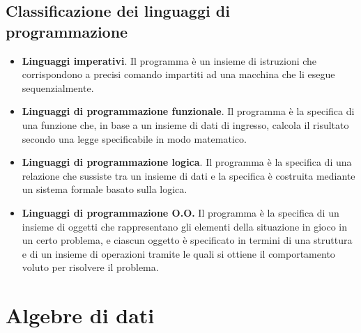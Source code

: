 \documentclass[12pt]{report}
\begin{document}
	\section{Classificazione dei  linguaggi di programmazione}
	\begin{itemize}
		\item \textbf{Linguaggi imperativi}. Il programma è un insieme di istruzioni che corrispondono a precisi comando impartiti ad una macchina che li esegue sequenzialmente.
		\item \textbf{Linguaggi di programmazione funzionale}. Il programma è la specifica di una funzione che, in base a un insieme di dati di ingresso, calcola il risultato secondo una legge specificabile in modo matematico.
		\item \textbf{Linguaggi di programmazione logica}. Il programma è la specifica di una relazione che sussiste tra un insieme di dati e la specifica è costruita mediante un sistema formale basato sulla logica.
		\item \textbf{Linguaggi di programmazione O.O.} Il programma è la specifica di un insieme di oggetti che rappresentano gli elementi della situazione in gioco in un certo problema, e ciascun oggetto è specificato in termini di una struttura e di un insieme di operazioni tramite le quali si ottiene il comportamento voluto per risolvere il problema.
	\end{itemize}
	\chapter{Algebre di dati}
\end{document}
